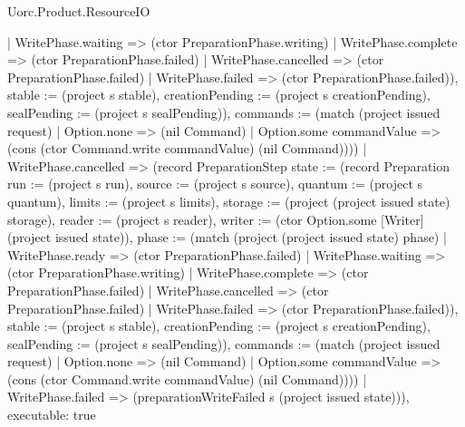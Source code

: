 \begin{lexlean}{Uorc.Product.ResourceIO}
\begin{semanticmodule}
{{{      | WritePhase.waiting => (ctor PreparationPhase.writing)
      | WritePhase.complete => (ctor PreparationPhase.failed)
      | WritePhase.cancelled => (ctor PreparationPhase.failed)
      | WritePhase.failed => (ctor PreparationPhase.failed)), stable := (project s stable), creationPending := (project s creationPending), sealPending := (project s sealPending)}), commands := (match (project issued request)
      | Option.none => (nil Command)
      | Option.some commandValue => (cons (ctor Command.write commandValue) (nil Command)))})
    | WritePhase.cancelled => (record PreparationStep {state := (record Preparation {run := (project s run), source := (project s source), quantum := (project s quantum), limits := (project s limits), storage := (project (project issued state) storage), reader := (project s reader), writer := (ctor Option.some [Writer] (project issued state)), phase := (match (project (project issued state) phase)
      | WritePhase.ready => (ctor PreparationPhase.failed)
      | WritePhase.waiting => (ctor PreparationPhase.writing)
      | WritePhase.complete => (ctor PreparationPhase.failed)
      | WritePhase.cancelled => (ctor PreparationPhase.failed)
      | WritePhase.failed => (ctor PreparationPhase.failed)), stable := (project s stable), creationPending := (project s creationPending), sealPending := (project s sealPending)}), commands := (match (project issued request)
      | Option.none => (nil Command)
      | Option.some commandValue => (cons (ctor Command.write commandValue) (nil Command)))})
    | WritePhase.failed => (preparationWriteFailed s (project issued state))),
  executable: true
}


\end{semanticmodule}
\end{lexlean}
